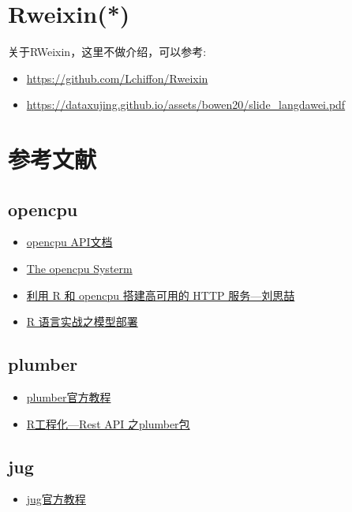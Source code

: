 \documentclass[]{book}
\providecommand{\tightlist}{%
  \setlength{\itemsep}{0pt}\setlength{\parskip}{0pt}}
\begin{document}
\chapter{Rweixin(*)}\label{rweixin}

关于RWeixin，这里不做介绍，可以参考:

\begin{itemize}
\item
  \url{https://github.com/Lchiffon/Rweixin}
\item
  \url{https://dataxujing.github.io/assets/bowen20/slide_langdawei.pdf}
\end{itemize}

\chapter{参考文献}\label{reference}

\section{opencpu}\label{opencpu-1}

\begin{itemize}
\tightlist
\item
  \href{https://www.opencpu.org/}{opencpu API文档}
\item
  \href{https://jeroen.github.io/opencpu-slides/\#1}{The opencpu
  Systerm}
\item
  \href{http://www.bjt.name/2017/04/28/opencpu-application.html}{利用 R
  和 opencpu 搭建高可用的 HTTP 服务---刘思喆}
\item
  \href{https://cosx.org/2018/12/model-deployment-in-action-with-r/}{R
  语言实战之模型部署}
\end{itemize}

\section{plumber}\label{plumber-1}

\begin{itemize}
\tightlist
\item
  \href{https://www.rplumber.io/}{plumber官方教程}
\item
  \href{https://mp.weixin.qq.com/s/RtP4AXp33XkA9e99hjW-BQ}{R工程化---Rest
  API 之plumber包}
\end{itemize}

\section{jug}\label{jug-1}

\begin{itemize}
\tightlist
\item
  \href{http://bart6114.github.io/jug/articles/jug.html}{jug官方教程}
\end{itemize}


\end{document}
